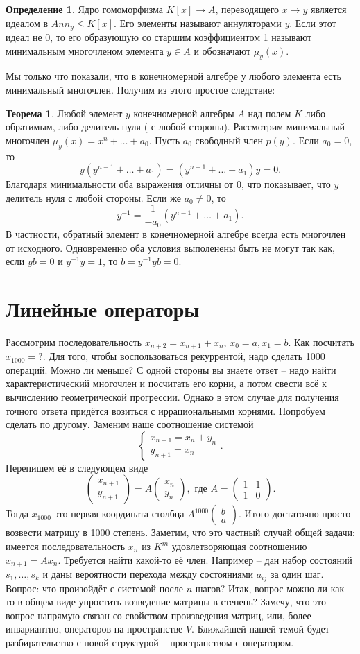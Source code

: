\documentclass[10pt,a4paper,oneside]{book}
\theoremstyle{definition}
\newtheorem*{defn}{Определение}
\newtheorem{thm}{Теорема}
\def\thrm{\begin{thm}}
\def\ethrm{\end{thm}}
\def\dfn{\begin{defn}}
\def\edfn{\end{defn}}
\def\pmat{\begin{pmatrix}}
\def\epmat{\end{pmatrix}}
\begin{document}
\dfn Ядро гомоморфизма $K[x] \to A$, переводящего $x \to y$ является идеалом в $Ann_y\leq K[x]$. Его элементы называют аннуляторами $y$. Если этот идеал не 0, то его образующую со старшим коэффициентом 1 называют минимальным многочленом элемента $y\in A$ и обозначают $\mu_y(x)$.
\edfn

Мы только что показали, что в конечномерной алгебре у любого элемента есть минимальный многочлен. Получим из этого простое следствие:

\thrm Любой элемент $y$ конечномерной алгебры $A$ над полем $K$ либо обратимым, либо делитель нуля ( с любой стороны).
\proof Рассмотрим минимальный многочлен $\mu_y(x)= x^n+ \dots+a_0$. Пусть $a_0$ свободный член $p(y)$. Если $a_0=0$, то $$y(y^{n-1}+
\dots + a_1)=(y^{n-1}+
\dots + a_1)y=0.$$ Благодаря минимальности оба выражения отличны от 0, что показывает, что $y$ делитель нуля с любой стороны. Если же $a_0\neq 0$, то $$y^{-1}=\frac{1}{-a_0}(y^{n-1}+
\dots + a_1).$$ В частности, обратный элемент в конечномерной алгебре всегда есть многочлен от исходного. Одновременно оба условия выполенены быть не могут так как, если $yb=0$ и $y^{-1}y=1$, то $b=y^{-1}yb=0$.
\endproof
\ethrm








\section{Линейные операторы}

Рассмотрим последовательность $x_{n+2}=x_{n+1}+x_{n}$, $x_0=a,x_1=b$. Как посчитать $x_{1000}=?$. Для того, чтобы воспользоваться рекуррентой, надо сделать 1000 операций. Можно ли меньше? С одной стороны вы знаете ответ -- надо найти характеристический многочлен и посчитать его корни, а потом свести всё к вычислению геометрической прогрессии.  Однако в этом случае для получения точного ответа придётся возиться с  иррациональными корнями. Попробуем сделать по другому. Заменим наше соотношение системой
$$ \begin{cases} x_{n+1}=x_n+y_n \\
y_{n+1}=x_{n}
\end{cases}.$$
Перепишем её в следующем виде
$$ \pmat x_{n+1}\\ y_{n+1}\epmat = A \pmat  x_{n}\\ y_n \epmat, \text{ где } A=\pmat 1& 1\\ 1& 0 \epmat.$$
Тогда  $x_{1000}$ это первая координата столбца $A^{1000} \pmat b\\ a\epmat $. Итого достаточно просто возвести матрицу в 1000 степень. Заметим, что это частный случай общей задачи: имеется последовательность $x_n$ из $K^m$ удовлетворяющая соотношению $x_{n+1}=Ax_n$. Требуется найти какой-то её член. Например -- дан  набор состояний $s_1,\dots,s_k$ и даны вероятности перехода между состояниями $a_{ij}$ за один шаг. Вопрос: что произойдёт с системой после $n$ шагов?
Итак, вопрос можно ли как-то в общем виде упростить возведение матрицы в степень? Замечу, что это вопрос напрямую связан со  свойством произведения матриц, или, более инвариантно,   операторов на пространстве $V$. Ближайшей нашей темой будет разбирательство с новой структурой -- пространством с оператором.
\end{document}
